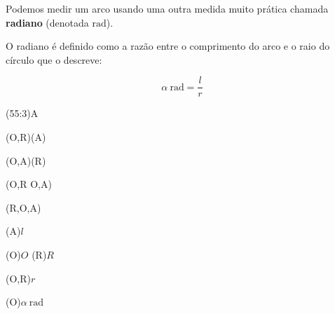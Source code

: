 \begin{multi}

	\noindent Podemos medir um arco usando uma outra medida muito prática chamada \textbf{radiano} (denotada $\si{\radian}$).

	\noindent O radiano é definido como a razão entre o comprimento do arco e o raio do círculo que o descreve:

	$$\alpha~\si{\radian}=\frac{l}{r}$$

	\nextcol

	\begin{tikzscale}[0.8]

		\begin{scope}
			\tkzDefPoint(55:3){A}
		\end{scope}

		\tkzDrawArc[color=red, thick](O,R)(A)

		\tkzDrawArc[color=black](O,A)(R)

		\tkzDrawSegments(O,R O,A)

		\tkzMarkAngle[size=1](R,O,A)


		\tkzLabelPoint[xshift=25, yshift=-15](A){$l$}

		\tkzLabelPoint[xshift=-15pt, yshift=3pt](O){$O$}
		\tkzLabelPoint[xshift=0pt, yshift=3pt](R){$R$}

		\tkzLabelSegment[below](O,R){$r$}

		\tkzLabelPoint[xshift=19pt, yshift=21pt](O){$\alpha~\si{\radian}$}
	\end{tikzscale}
\end{multi}


